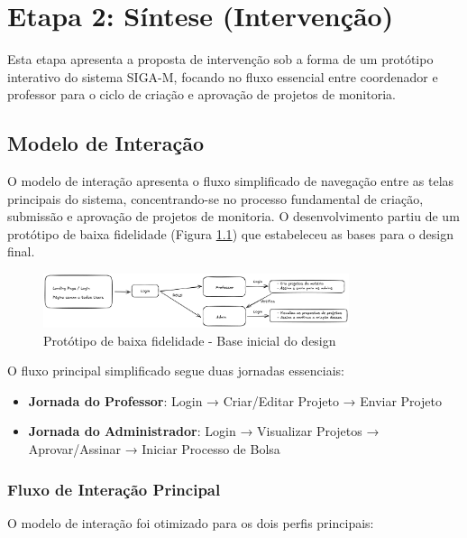 \documentclass[12pt, a4paper]{report}
\begin{document}
\chapter{Etapa 2: Síntese (Intervenção)}
\label{ch:sintese}

Esta etapa apresenta a proposta de intervenção sob a forma de um protótipo interativo do sistema SIGA-M, focando no fluxo essencial entre coordenador e professor para o ciclo de criação e aprovação de projetos de monitoria.

\section{Modelo de Interação}

O modelo de interação apresenta o fluxo simplificado de navegação entre as telas principais do sistema, concentrando-se no processo fundamental de criação, submissão e aprovação de projetos de monitoria. O desenvolvimento partiu de um protótipo de baixa fidelidade (Figura \ref{fig:excalidraw}) que estabeleceu as bases para o design final.

\begin{figure}[H]
\centering
\includegraphics[width=0.8\textwidth]{figma/excalidraw-design.png}
\caption{Protótipo de baixa fidelidade - Base inicial do design}
\label{fig:excalidraw}
\end{figure}

O fluxo principal simplificado segue duas jornadas essenciais:
\begin{itemize}
    \item \textbf{Jornada do Professor}: Login → Criar/Editar Projeto → Enviar Projeto
    \item \textbf{Jornada do Administrador}: Login → Visualizar Projetos → Aprovar/Assinar → Iniciar Processo de Bolsa
\end{itemize}

\subsection{Fluxo de Interação Principal}

O modelo de interação foi otimizado para os dois perfis principais:
\end{document}
